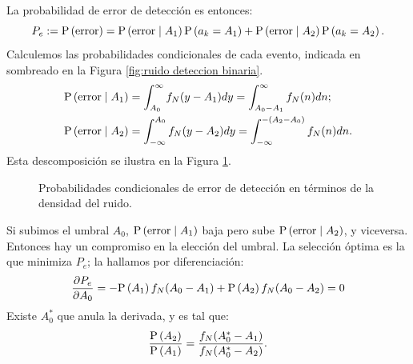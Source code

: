 La probabilidad de error de detección es entonces:
\begin{equation*}
P_e := \mathrm{P}\left(\text{error}\right) = \mathrm{P}\left(\text{error}\mid A_1\right) \mathrm{P}\left(a_k=A_1\right) + \mathrm{P}\left(\text{error}\mid A_2\right) \mathrm{P}\left(a_k=A_2\right).
\end{equation*}
Calculemos las probabilidades condicionales de cada evento, indicada en sombreado en la Figura \ref{fig:ruido deteccion binaria}.
\begin{align*}
    \mathrm{P}\left(\text{error}\mid A_1\right) &= \int_{A_0}^\infty f_N(y-A_1)dy = \int_{A_0-A_1}^\infty f_N(n) dn;\\
    \mathrm{P}\left(\text{error}\mid A_2\right) &= \int_{-\infty}^{A_0} f_N(y-A_2)dy = \int_{-\infty}^{-(A_2-A_0)} f_N(n)dn.\\
\end{align*}
Esta descomposición se ilustra en la Figura \ref{fig:ruido deteccion binaria 2}.
\begin{figure}
    \begin{center}
    \end{center}
    \caption{Probabilidades condicionales de error de detección en términos de la densidad del ruido.}\label{fig:ruido deteccion binaria 2}
\end{figure}

Si subimos el umbral $A_0$, $\mathrm{P}\left(\text{error}\mid A_1\right)$ baja pero sube $\mathrm{P}\left(\text{error}\mid A_2\right)$, y viceversa. Entonces hay un compromiso en la elección del umbral. La selección óptima es la que minimiza $P_e$; la hallamos por
diferenciación:
\begin{equation*}
\frac{\partial P_e}{\partial A_0} = - \mathrm{P}\left(A_1\right) f_N (A_0 - A_1) + \mathrm{P}\left(A_2\right) f_N(A_0 - A_2) = 0
\end{equation*}
Existe $A_0^*$ que anula la derivada, y es tal que:
\begin{equation*}
\frac{\mathrm{P}\left(A_2\right)}{\mathrm{P}\left(A_1\right)}=\frac{f_N(A_0^*-A_1)}{f_N(A_0^*-A_2)}.    
\end{equation*}


